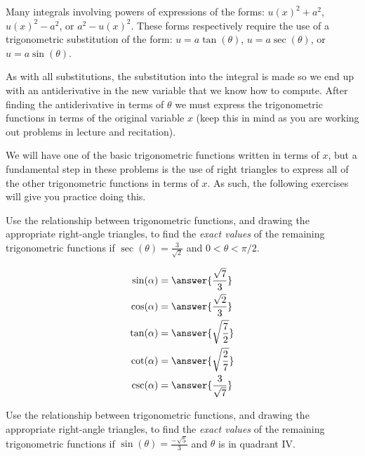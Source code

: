 \documentclass{ximera}
\author{Jim Talamo}
\begin{document}
\begin{exercise}


  Many integrals involving powers of expressions of the forms: $u(x)^2 + a^2$, $u(x)^2 - a^2$, or $a^2 - u(x)^2$.
  These forms respectively require the use of a trigonometric substitution of the form: $u = a \tan(\theta)$, $u = a \sec(\theta)$, or $u = a \sin(\theta)$.
 
  As with all substitutions, the substitution into the integral is made so we end up with an antiderivative in the new variable that we know how to compute.
  After finding the antiderivative in terms of $\theta$ we must express the trigonometric functions in terms of the original variable $x$ (keep this in mind as you are working out problems in lecture and recitation). 
  
  We will have one of the basic trigonometric functions written in terms of $x$, but a fundamental step in these problems is the use of right triangles to express all of the other trigonometric functions in terms of $x$.
  As such, the following exercises will give you practice doing this.
  
  \begin{multipleChoice}
  \end{multipleChoice}  

\begin{problem}
  Use the relationship between trigonometric functions, and drawing the appropriate right-angle triangles, to find the \emph{exact values} of the remaining trigonometric functions if $\sec(\theta) = \frac{3}{\sqrt{2}}$ and $0 < \theta < \pi/2$.
  
    \begin{align*}
      \sin(\alpha) &= \answer{\frac{\sqrt{7}}{3}}  \\
      \cos(\alpha) &= \answer{\frac{\sqrt{2}}{3}}  \\
      \tan(\alpha) &= \answer{\sqrt{\frac{7}{2}}}  \\
      \cot(\alpha) &= \answer{\sqrt{\frac{2}{7}}}  \\
      \csc(\alpha) &= \answer{\frac{3}{\sqrt{7}}}
    \end{align*}  
\end{problem}

\begin{problem}
   Use the relationship between trigonometric functions, and drawing the appropriate right-angle triangles, to find the \emph{exact values} of the remaining trigonometric functions if $\sin(\theta) = \frac{-\sqrt{5}}{3}$ and $\theta$ is in quadrant IV.
  

\end{problem}
\end{exercise}
\end{document}
